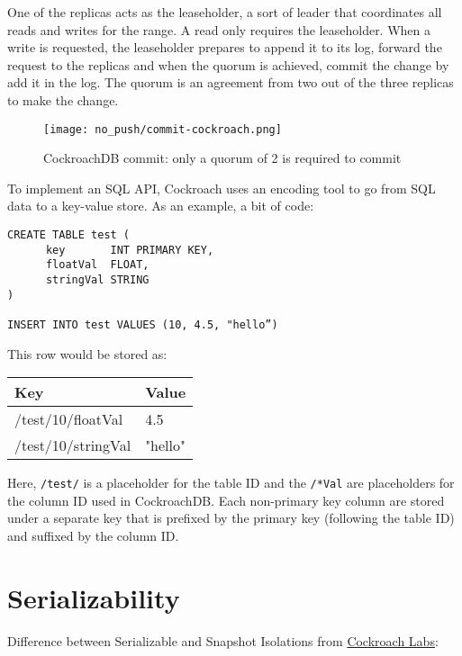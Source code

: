 \documentclass[a4paper, 10pt, titlepage]{report}
\begin{document}
One of the replicas acts as the leaseholder, a sort of leader that coordinates all reads and writes for the range. A read only requires the leaseholder.
When a write is requested, the leaseholder prepares to append it to its log, forward the request to the replicas and when the quorum is achieved, commit the change by add it in the log. The quorum is an agreement from two out of the three replicas to make the change.

\begin{figure}[H]
  \vspace{-10pt}
  \centering
  \centerline{\texttt{[image: no\_push/commit-cockroach.png]}}
  \vspace{-5pt}
  \caption{CockroachDB commit: only a quorum of 2 is required to commit }
  \vspace{-5pt}
  \label{fig:cockroachdb-commit}
\end{figure}

To implement an SQL API, Cockroach uses an encoding tool to go from SQL data to a key-value store\cite{CRDB:mapKV}. As an example, a bit of code:
\begin{verbatim}
CREATE TABLE test (
      key       INT PRIMARY KEY,
      floatVal  FLOAT,
      stringVal STRING
)

INSERT INTO test VALUES (10, 4.5, "hello”)
\end{verbatim}

This row would be stored as:

\begin{center}
\begin{tabular}{|l|l|}
\hline
Key & Value\\
\hline
/test/10/floatVal & 4.5\\
/test/10/stringVal & "hello"\\
\hline
\end{tabular}
\end{center}

Here, \verb~/test/~ is a placeholder for the table ID and the \verb~/*Val~ are placeholders for the column ID used in CockroachDB. Each non-primary key column are stored under a separate key that is prefixed by the primary key (following the table ID) and suffixed by the column ID.


\label{sec:serial}
\section{Serializability}
Difference between Serializable and Snapshot Isolations from \href{https://www.cockroachlabs.com/blog/what-write-skew-looks-like/}{Cockroach Labs}:
\end{document}

